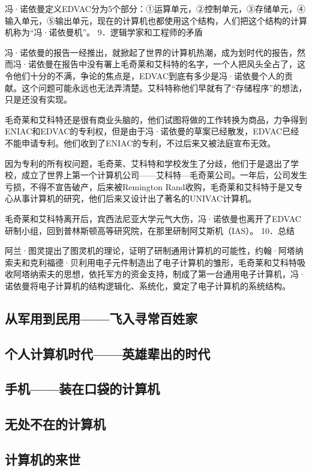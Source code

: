 \documentclass[12pt,UTF8]{ctexbook}
\begin{document}
冯·诺依曼定义EDVAC分为5个部分：①运算单元，②控制单元，③存储单元，④输入单元，⑤输出单元，现在的计算机也都使用这个结构，人们把这个结构的计算机称为“冯·诺依曼机”。
9．逻辑学家和工程师的矛盾

冯·诺依曼的报告一经推出，就掀起了世界的计算机热潮，成为划时代的报告，然而冯·诺依曼在报告中没有署上毛奇莱和艾科特的名字，一个人把风头全占了，这令他们十分的不满，争论的焦点是，EDVAC到底有多少是冯·诺依曼个人的贡献。这个问题可能永远也无法弄清楚。艾科特称他们早就有了“存储程序”的想法，只是还没有实现。

毛奇莱和艾科特还是很有商业头脑的，他们试图将做的工作转换为商品，力争得到ENIAC和EDVAC的专利权，但是由于冯·诺依曼的草案已经散发，EDVAC已经不能申请专利。他们收到了ENIAC的专利，不过后来又被法庭宣布无效。

因为专利的所有权问题，毛奇莱、艾科特和学校发生了分歧，他们于是退出了学校，成立了世界上第一个计算机公司——艾科特—毛奇莱公司。一年后，公司发生亏损，不得不宣告破产，后来被Remington Rand收购，毛奇莱和艾科特于是又专心从事计算机的研究，他们后来又设计出了著名的UNIVAC计算机。

毛奇莱和艾科特离开后，宾西法尼亚大学元气大伤，冯·诺依曼也离开了EDVAC研制小组，回到普林斯顿高等研究院，在那里研制阿艾斯机（IAS）。
10．总结

阿兰·图灵提出了图灵机的理论，证明了研制通用计算机的可能性，约翰·阿塔纳索夫和克利福德·贝利用电子元件制造出了电子计算机的雏形，毛奇莱和艾科特吸收阿塔纳索夫的思想，依托军方的资金支持，制成了第一台通用电子计算机，冯·诺依曼将电子计算机的结构逻辑化、系统化，奠定了电子计算机的系统结构。

\subsection{从军用到民用——飞入寻常百姓家}

\subsection{个人计算机时代——英雄辈出的时代}

\subsection{手机——装在口袋的计算机}

\subsection{无处不在的计算机}

\subsection{计算机的来世}
\end{document}
